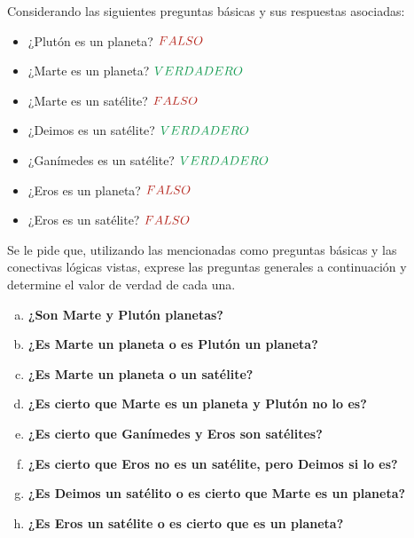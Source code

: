 \begin{exercise}
    Considerando las siguientes preguntas básicas y sus respuestas asociadas:
    \begin{itemize}
        \item ¿Plutón es un planeta? $\lfalsefull$
        \item ¿Marte es un planeta?  $\ltruefull$
        \item ¿Marte es un satélite? $\lfalsefull$
        \item ¿Deimos es un satélite?  $\ltruefull$
        \item ¿Ganímedes es un satélite?  $\ltruefull$
        \item ¿Eros es un planeta? $\lfalsefull$
        \item ¿Eros es un satélite? $\lfalsefull$
    \end{itemize}

    Se le pide que, utilizando las mencionadas como preguntas básicas y las
    conectivas lógicas vistas, exprese las preguntas generales a continuación y
    determine el valor de verdad de cada una.
    \begin{enumerate}[a)]
        \item \textbf{¿Son Marte y Plutón planetas?}
        \item \textbf{¿Es Marte un planeta o es Plutón un planeta?}
        \item \textbf{¿Es Marte un planeta o un satélite?}
        \item \textbf{¿Es cierto que Marte es un planeta y Plutón no lo es?}
        \item \textbf{¿Es cierto que Ganímedes y Eros son satélites?}
        \item \textbf{¿Es cierto que Eros no es un satélite, pero Deimos si lo
        es?}
        \item \textbf{¿Es Deimos un satélito o es cierto que Marte es un
        planeta?}
        \item \textbf{¿Es Eros un satélite o es cierto que es un planeta?}
    \end{enumerate}
\end{exercise}

